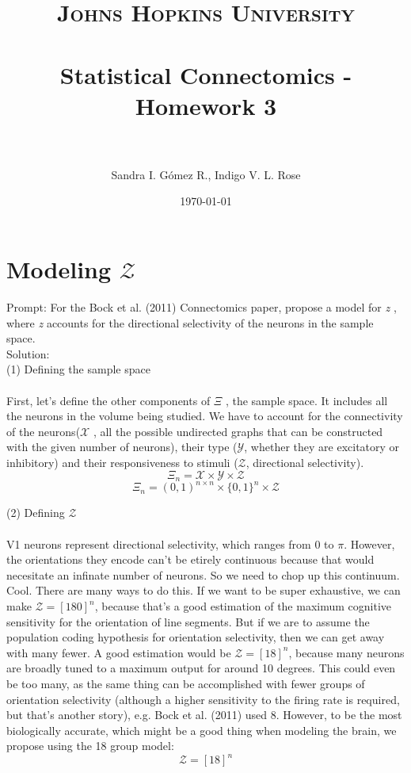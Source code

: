 \documentclass[paper=a4, fontsize=11pt]{scrartcl} %
\title{	
\normalfont \normalsize 
\textsc{Johns Hopkins University} \\ [25pt] %
\horrule{0.5pt} \\[0.4cm] %
\huge Statistical Connectomics - Homework 3 \\ %
\horrule{2pt} \\[0.5cm] %
}
\author{Sandra I. G\'{o}mez R., Indigo V. L. Rose} %
\date{\normalsize\today} %
\numberwithin{equation}{section} %
\numberwithin{figure}{section} %
\numberwithin{table}{section} %
\begin{document}
\maketitle %


\section{Modeling $\mathcal{Z}$}
Prompt: For the Bock et al. (2011) Connectomics paper, propose a model for  \textit{z} , where \textit{z}  accounts for the directional selectivity of the neurons in the sample space. \\

Solution: \\

(1) Defining the sample space
\\
\\
First, let's define the other components of   $\Xi$ , the sample space. It includes all the neurons in the volume being studied. We have to account for the connectivity of the neurons($\mathcal{X}$ , all the possible undirected graphs that can be constructed with the given number of neurons), their type ($\mathcal{Y}$, whether they are excitatory or inhibitory) and their responsiveness to stimuli ($\mathcal{Z}$, directional selectivity).\\ 

\[\Xi_n =\mathcal{X} \times \mathcal{Y} \times \mathcal{Z}\]
\[\Xi_n = (0,1)^{n\times n} \times \{0,1\}^n \times \mathcal{Z} \]

(2) Defining $\mathcal{Z}$
\\
\\ 
V1 neurons represent directional selectivity, which ranges from 0 to $\pi$. However, the orientations they encode can't be etirely continuous because that would necesitate an infinate number of neurons. So we need to chop up this continuum. Cool. There are many ways to do this. If we want to be super exhaustive, we can make $\mathcal{Z}=[180]^n$, because that's a good estimation of the maximum cognitive sensitivity for the orientation of line segments. But if we are to assume the population coding hypothesis for orientation selectivity, then we can get away with many fewer. A good estimation would be $\mathcal{Z}=[18]^n$, because many neurons are broadly tuned to a maximum output for around 10 degrees. This could even be too many, as the same thing can be accomplished with fewer groups of orientation selectivity (although a higher sensitivity to the firing rate is required, but that's another story), e.g. Bock et al. (2011) used 8. However, to be the most biologically accurate, which might be a good thing when modeling the brain, we propose using the 18 group model:
\[\mathcal{Z}=[18]^n\]
\end{document}
